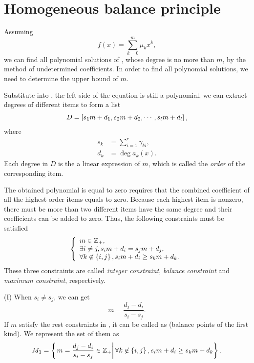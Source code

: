 \section{Homogeneous balance principle}\label{Homogeneous-02}

Assuming
\begin{equation}
f(x)=\sum_{k=0}^m{\mu_kx^k},
\label{fm1}
\end{equation}
we can find all polynomial solutions of , whose degree is no more than $m$, by the method of undetermined coefficients. In order to find all polynomial solutions, we need to determine the upper bound of $m$.

Substitute  into , the left side of the equation is still a polynomial, we can extract degrees of different items to form a list
\begin{equation}
D = \left[s_1 m+d_1,s_2 m+d_2,\cdots,s_l m+d_l\right],
\end{equation}
where
\begin{equation}
\begin{split}
s_k&=\sum_{i=1}^r{\gamma_{ki}}, \\
d_k&=\deg a_k(x).
\end{split}
\label{eq-sd}
\end{equation}
Each degree in $D$ is the a linear expression of $m$, which is called the \emph{order} of the corresponding item.

The obtained polynomial is equal to zero requires that the combined coefficient of all the highest order items equals to zero. Because each highest item is nonzero, there must be more than two different items have the same degree and their coefficients can be added to zero. Thus, the following constraints must be satisfied
\begin{equation}
\left\{
\begin{array}{l}
m\in \mathbb Z_+  ,                                     \\
\exists i\neq j, s_i m+d_i=s_j m+d_j    ,               \\
\forall k \not\in \left\{i,j\right\}, s_i m+d_i\ge s_k m+d_k .
\end{array}
\right.
\label{cond}
\end{equation}
These three constraints are called \emph{integer constraint}, \emph{balance constraint} and \emph{maximum constraint}, respectively.

(I) When $s_i \neq s_j$, we can get
\begin{equation}
m=\frac{d_j-d_i}{s_i-s_j}.
\end{equation}
If $m$ satisfy the rest constraints in , it can be called as \BPone{} (balance points of the first kind). We represent the set of them as
\begin{equation}
M_1=\left\{\left. m=\frac{d_j-d_i}{s_i-s_j}\in \mathbb Z_+\right\vert \forall k\not\in \left\{i,j\right\}, s_i m+d_i\ge s_k m+d_k\right\}.
\end{equation}

